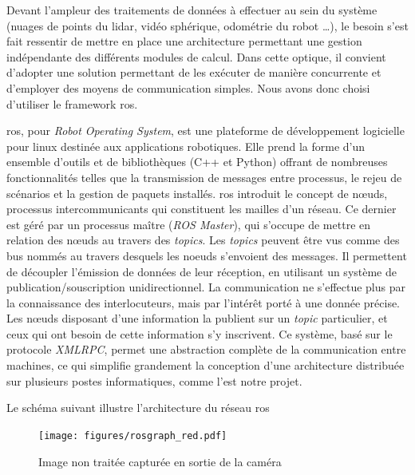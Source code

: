 			Devant l'ampleur des traitements de données à effectuer au sein du système (nuages de points du \gls{lidar}, vidéo sphérique, odométrie du robot \ldots), le besoin s'est fait ressentir de mettre en place une architecture permettant une gestion indépendante des différents modules de calcul. Dans cette optique, il convient d'adopter une solution permettant de les exécuter de manière concurrente et d'employer des moyens de communication simples. Nous avons donc choisi d'utiliser le framework \gls{ros}.
			\par
			\gls{ros}, pour \emph{Robot Operating System}, est une plateforme de développement logicielle pour linux destinée aux applications robotiques. Elle prend la forme d'un ensemble d'outils et de bibliothèques (C++ et Python) offrant de nombreuses fonctionnalités telles que la transmission de messages entre processus, le rejeu de scénarios et la gestion de paquets installés. \gls{ros} introduit le concept de n\oe{}uds, processus intercommunicants qui constituent les mailles d'un réseau. Ce dernier est géré par un processus maître (\emph{ROS Master}), qui s'occupe de mettre en relation des n\oe{}uds au travers des \emph{topics}. Les \emph{topics} peuvent être vus comme des bus nommés au travers desquels les noeuds s'envoient des messages.
			Il permettent de découpler l'émission de données de leur réception, en utilisant un système de publication/souscription unidirectionnel. La communication ne s'effectue plus par la connaissance des interlocuteurs, mais par l'intérêt porté à une donnée précise.
			Les n\oe{}uds disposant d'une information la publient sur un \emph{topic} particulier, et ceux qui ont besoin de cette information s'y inscrivent. Ce système, basé sur le protocole \emph{XMLRPC}, permet une abstraction complète de la communication entre machines, ce qui simplifie grandement la conception d'une architecture distribuée sur plusieurs postes informatiques, comme l'est notre projet.
			\par
			Le schéma suivant illustre l'architecture du réseau \gls{ros}
			\begin{figure}[H]
			{
				\centering
				\texttt{[image: figures/rosgraph\_red.pdf]}
				\caption{Image non traitée capturée en sortie de la caméra}
				\label{fig:rawcapture}
			}
			\end{figure}
			
			
			
